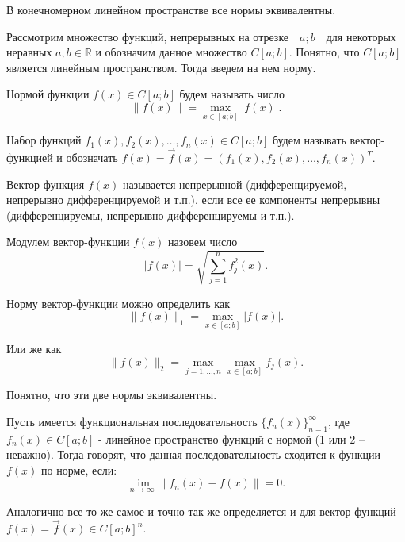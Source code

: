 \begin{proposition}
	В конечномерном линейном пространстве все нормы эквивалентны.
\end{proposition}

Рассмотрим множество функций, непрерывных на отрезке $[a; b]$ для некоторых неравных $a, b \in \mathbb{R}$ и обозначим данное множество $C[a; b]$. Понятно, что $C[a; b]$ является линейным пространством. Тогда введем на нем норму.

\begin{definition}
	Нормой функции $f(x) \in C[a; b]$ будем называть число $$\|f(x)\| = \max_{x \in [a; b]}|f(x)|.$$
\end{definition}

\begin{definition}
	Набор функций $f_1(x), f_2(x), \dots, f_n(x) \in C[a; b]$ будем называть вектор-функцией и обозначать $f(x) = \vec{f}(x) = \left(f_1(x), f_2(x), \dots, f_n(x)\right)^T$.
\end{definition}

\begin{definition}
	Вектор-функция $f(x)$ называется непрерывной (дифференцируемой, непрерывно дифференцируемой и т.п.), если все ее компоненты непрерывны (дифференцируемы, непрерывно дифференцируемы и т.п.).
\end{definition}

\begin{definition}
	Модулем вектор-функции $f(x)$ назовем число
	\begin{equation*}
		|f(x)| = \sqrt{\sum_{j = 1}^{n} f_j^2(x) }.
	\end{equation*}
\end{definition}

Норму вектор-функции можно определить как $$\|f(x)\|_1 = \max_{x \in [a; b]}|f(x)|.$$

Или же как $$\|f(x)\|_2 = \max_{j = 1, \dots, n} \max_{x \in [a; b]} f_j(x).$$

Понятно, что эти две нормы эквивалентны.

\begin{definition}
	Пусть имеется функциональная последовательность $\{f_n(x)\}_{n = 1}^{\infty}$, где $f_n(x) \in C[a; b]$ - линейное пространство функций с нормой (1 или 2 -- неважно). Тогда говорят, что данная последовательность сходится к функции $f(x)$ по норме, если:
	\begin{equation*}
		\lim\limits_{n\rightarrow \infty} \|f_n(x) - f(x)\| = 0.
	\end{equation*}

Аналогично все то же самое и точно так же определяется и для вектор-функций $f(x) = \vec{f}(x) \in C[a; b]^n$.
\end{definition}

